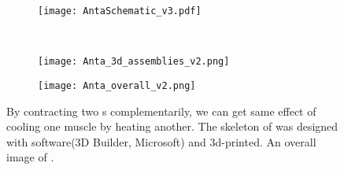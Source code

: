 \begin{figure}[t]
	\centering
	\begin{subfigure}[t]{0.5\textwidth}
		\centering\texttt{[image: AntaSchematic\_v3.pdf]}
		\caption{\label{anta_sch}}
	\end{subfigure}
	~			
	\begin{subfigure}[t]{0.3\textwidth}
		\centering\texttt{[image: Anta\_3d\_assemblies\_v2.png]}
		\caption{\label{3d_assemblies}}
	\end{subfigure}
	
	\begin{subfigure}[t]{0.81\textwidth}
		\centering\texttt{[image: Anta\_overall\_v2.png]}
		\caption{\label{anta_overall}}
	\end{subfigure}
	
	\caption[An \anta]{ By contracting two \scpnospace s complementarily, we can get same effect of cooling one muscle by heating another.  The skeleton of \anta was designed with software(3D Builder, Microsoft) and 3d-printed.  An overall image of \antanospace.}
	\label{anta_design}
\end{figure}

